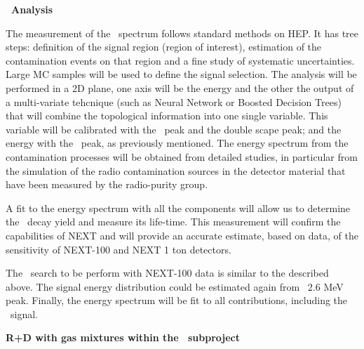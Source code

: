 {\bf \bb ~Analysis}

The measurement of the \bb ~spectrum follows standard methods on HEP. It has tree steps: definition of the signal region (region of interest), estimation of the contamination events on that region and a fine study of systematic uncertainties. Large MC samples will be used to define the signal selection.
The analysis will be performed in a 2D plane, one axis will be the energy and the other the output of a multi-variate tehcnique (such as Neural Network or Boosted Decision Trees) that will combine the topological information into one single variable. This variable will be calibrated with the \Tl ~peak and the double scape peak; and the energy with the \Tl ~peak, as previously mentioned. The energy spectrum from the contamination processes will be obtained from detailed studies, in particular from the simulation of the radio contamination sources in the detector material that have been measured by the radio-purity group.

A fit to the energy spectrum with all the components will allow us to determine the \bb ~decay yield and measure its life-time.
This measurement will confirm the capabilities of NEXT and will provide an accurate estimate, based on data, of the sensitivity of NEXT-100 and NEXT 1 ton detectors. 

The \bbonu ~search to be perform with NEXT-100 data is similar to the described above. The signal energy distribution could be estimated again from \Tl ~2.6 MeV peak. Finally, the energy spectrum will be fit to all contributions, including the \bbonu ~signal.

{\bf R+D with gas mixtures within the \BATA ~subproject}

